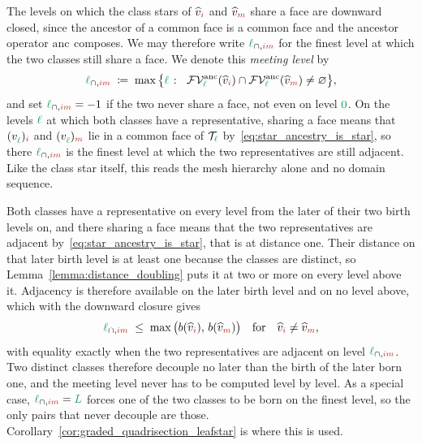 \documentclass[a4paper, 12pt]{article}
\newcommand{\lmeetIdx}[2]{\l_{\cap,#1#2}}
\newcommand{\green}{\color{ForestGreen}}
\newcommand{\brickred}{\color{BrickRed}}
\newcommand{\T}{\mathcal{T}}
\newcommand{\V}{\mathcal{V}}
\newcommand{\F}{\mathcal{F}}
\newcommand{\vertex}[2]{\freeQ{v}{}{#1}{#2}}
\newcommand{\vertexClass}[1]{\widehat{v}_{#1}}
\newcommand{\coarseIdxone}{{\brickred i}}
\newcommand{\coarseIdxtwo}{{\brickred m}}
\renewcommand{\l}{{\green\ell}}
\renewcommand{\L}{{\green L}}
\newcommand{\lzero}{{\green 0}}
\newcommand{\freeQ}[4]{ ( {#1}^{#2}_{#3} )_{#4}}
\theoremstyle{definition}
\theoremstyle{plain}
\numberwithin{equation}{section}
\newcommand{\birthLevel}{b}
\newcommand{\anc}[1]{\mathrm{anc}_{#1}}                     %
\newcommand{\FVanc}[1]{\F\V^{\mathrm{anc}}_{#1}}            %
\begin{document}
The levels on which the class stars of $\vertexClass{\coarseIdxone}$ and $\vertexClass{\coarseIdxtwo}$ share a face are downward closed, since the ancestor of a common face is a common face and the ancestor operator $\anc{}$ composes. We may therefore write $\lmeetIdx{\coarseIdxone}{\coarseIdxtwo}$ for the finest level at which the two classes still share a face. We denote this \emph{meeting level} by
\begin{equation}
    \label{eq:meeting_level}
    \lmeetIdx{\coarseIdxone}{\coarseIdxtwo} \; \coloneq \; \max \big\{ \l \; \colon \;\; \FVanc{\l} ( \vertexClass{\coarseIdxone} ) \cap \FVanc{\l} ( \vertexClass{\coarseIdxtwo} ) \neq \varnothing \big\},
\end{equation}
and set $\lmeetIdx{\coarseIdxone}{\coarseIdxtwo} = - 1$ if the two never share a face, not even on level $\lzero$. On the levels $\l$ at which both classes have a representative, sharing a face means that $\vertex{\l}{\coarseIdxone}$ and $\vertex{\l}{\coarseIdxtwo}$ lie in a common face of $\T_\l$ by~\eqref{eq:star_ancestry_is_star}, so there $\lmeetIdx{\coarseIdxone}{\coarseIdxtwo}$ is the finest level at which the two representatives are still adjacent. Like the class star itself, this reads the mesh hierarchy alone and no domain sequence.

Both classes have a representative on every level from the later of their two birth levels on, and there sharing a face means that the two representatives are adjacent by~\eqref{eq:star_ancestry_is_star}, that is at distance one. Their distance on that later birth level is at least one because the classes are distinct, so Lemma~\ref{lemma:distance_doubling} puts it at two or more on every level above it. Adjacency is therefore available on the later birth level and on no level above, which with the downward closure gives
\begin{equation}
    \label{eq:meeting_level_bound}
    \lmeetIdx{\coarseIdxone}{\coarseIdxtwo} \; \leq \; \max \big( \birthLevel(\vertexClass{\coarseIdxone}), \, \birthLevel(\vertexClass{\coarseIdxtwo}) \big) \quad \text{for} \quad \vertexClass{\coarseIdxone} \neq \vertexClass{\coarseIdxtwo},
\end{equation}
with equality exactly when the two representatives are adjacent on level $\lmeetIdx{\coarseIdxone}{\coarseIdxtwo}$. Two distinct classes therefore decouple no later than the birth of the later born one, and the meeting level never has to be computed level by level. As a special case, $\lmeetIdx{\coarseIdxone}{\coarseIdxtwo} = \L$ forces one of the two classes to be born on the finest level, so the only pairs that never decouple are those. Corollary~\ref{cor:graded_quadrisection_leafstar} is where this is used.
\end{document}
